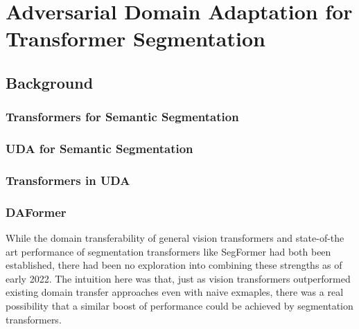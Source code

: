 \documentclass[a4paper,12pt]{report}
\begin{document}


\chapter{Adversarial Domain Adaptation for Transformer Segmentation}

\section{Background}

    \subsection*{Transformers for Semantic Segmentation}

    \subsection*{UDA for Semantic Segmentation}

    \subsection*{Transformers in UDA}

    \subsection*{DAFormer}

    While the domain transferability of general vision transformers and state-of-the art performance of segmentation transformers like SegFormer had both been established, there had been no exploration into combining these strengths as of early 2022.
    The intuition here was that, just as vision transformers outperformed existing domain transfer approaches even with naive exmaples, there was a real possibility that a similar boost of performance could be achieved by segmentation transformers.
\end{document}
